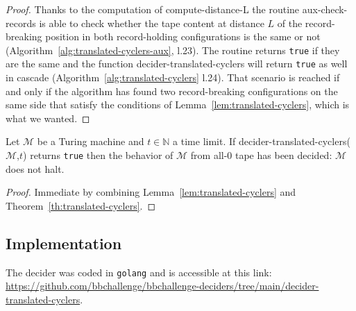 \begin{proof}
  Thanks to the computation of {\sc compute-distance-L} the routine {\sc aux-check-records} is able to check whether the tape content at distance $L$ of the record-breaking position in both record-holding configurations is the same or not (Algorithm~\ref{alg:translated-cyclers-aux}, l.23). The routine returns \texttt{true} if they are the same and the function {\sc decider-translated-cyclers} will return \texttt{true} as well in cascade (Algorithm~\ref{alg:translated-cyclers} l.24). That scenario is reached if and only if the algorithm has found two record-breaking configurations on the same side that satisfy the conditions of Lemma~\ref{lem:translated-cyclers}, which is what we wanted.
\end{proof}

\begin{corollary}
  Let $\mathcal{M}$ be a Turing machine and $t \in \mathbb{N}$ a time limit. If {\sc decider-translated-cyclers}($\mathcal{M}$,$t$) returns \texttt{true} then the behavior of $\mathcal{M}$ from all-0 tape has been decided: $\mathcal{M}$ does not halt.
\end{corollary}
\begin{proof}
  Immediate by combining Lemma~\ref{lem:translated-cyclers} and Theorem~\ref{th:translated-cyclers}.
\end{proof}

\subsection{Implementation}

The decider was coded in \texttt{golang} and is accessible at this link: \url{https://github.com/bbchallenge/bbchallenge-deciders/tree/main/decider-translated-cyclers}.

